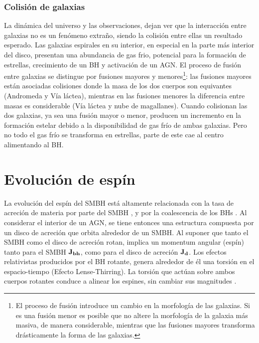     \subsubsection{Colisión de galaxias}
    \label{subsubsec: mergers_galaxys}
La dinámica del universo y las observaciones, dejan ver que la interacción entre galaxias no es un fenómeno extraño, siendo la colisión entre ellas un resultado esperado. Las galaxias espirales en su interior, en especial en la parte más interior del disco, presentan una abundancia de gas frio, potencial para la formación de estrellas, crecimiento de un BH y activación de un AGN. El proceso de fusión entre galaxias se distingue por fusiones mayores y menores\footnote{El proceso de fusión introduce un cambio en la morfología de las galaxias. Si es una fusión menor es posible que no altere la morfología de la galaxia más masiva, de manera considerable, mientras que las fusiones mayores transforma drásticamente la forma de las galaxias. }: las fusiones mayores están asociadas colisiones donde la masa de los dos cuerpos son equivantes (Andromeda y Vía láctea), mientras en las fusiones menores la diferencia entre masas es considerable (Vía láctea y nube de magallanes). Cuando colisionan las dos galaxias, ya sea una fusión mayor o menor, producen un incremento en la formación estelar debido a la disponibilidad de gas frío de ambas galaxias. Pero no todo el gas frío se transforma en estrellas, parte de este cae al centro alimentando al BH.

\section{Evolución de espín}
\label{sec: Evolution_spin}

La evolución del espín del SMBH está altamente relacionada con la tasa de acreción de materia por parte del SMBH \cite{king2005}, y por la coalescencia de los BHs \cite{dubois2014}. Al considerar el interior de un AGN, se tiene entonces una estructura compuesta por un disco de acreción que orbita alrededor de un SMBH. Al suponer que tanto el SMBH como el disco de acreción rotan, implica un momentum angular (espín) tanto para el SMBH $\bf{J}_{bh}$, como para el disco de acreción $\bf{J}_{d}$. 
Los efectos relativistas producidos por el BH rotante, genera alrededor de él una torsión en el espacio-tiempo (Efecto Lense-Thirring).    
La torsión que actúan sobre ambos cuerpos rotantes conduce a alinear los espines, sin cambiar sus magnitudes \cite{king2005}.

